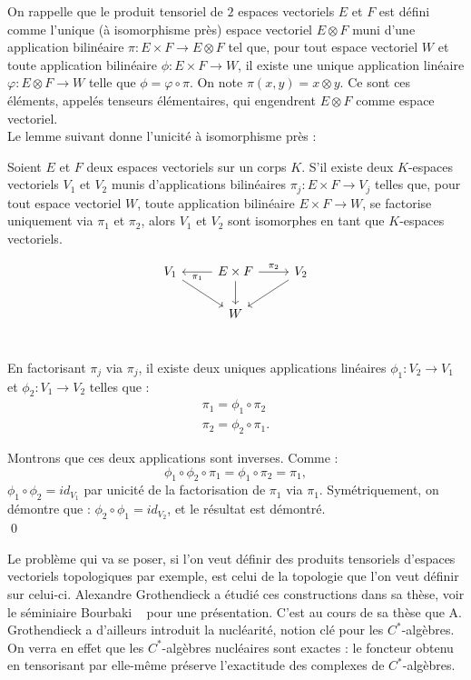 On rappelle que le produit tensoriel de $2$ espaces vectoriels $E$ et $F$ est défini comme l'unique (à isomorphisme près) espace vectoriel $E\otimes F$ muni d'une application bilinéaire $\pi : E\times F \rightarrow E\otimes F$ tel que, pour tout espace vectoriel $W$ et toute application bilinéaire $\phi : E \times F \rightarrow W $, il existe une unique application linéaire $\varphi :E\otimes F \rightarrow W$ telle que $\phi = \varphi\circ \pi$. On note $\pi(x,y)=x\otimes y$. Ce sont ces éléments, appelés tenseurs élémentaires, qui engendrent $E\otimes F$ comme espace vectoriel.\\ 

Le lemme suivant donne l'unicité à isomorphisme près :

\begin{lem}
Soient $E$ et $F$ deux espaces vectoriels sur un corps $K$. S'il existe deux $K$-espaces vectoriels $V_1$ et $V_2$ munis d'applications bilinéaires $\pi_j : E\times F \rightarrow V_j$ telles que, pour tout espace vectoriel $W$, toute application bilinéaire $E\times F \rightarrow W$,  se factorise uniquement via $\pi_1$ et $\pi_2$, alors $V_1$ et $V_2$ sont isomorphes en tant que $K$-espaces vectoriels.
\end{lem}


\[\begin{tikzcd}
V_1 \arrow{dr}& \arrow{l}{\pi_1}	E\times F \arrow{d}\arrow{r}{\pi_2}	& \arrow{dl}V_2 \\
			 & 		W		&	\\
\end{tikzcd}\]

\begin{dem}
En factorisant $\pi_j$ via $\pi_j$, il existe deux uniques applications linéaires $\phi_1 : V_2\rightarrow V_1$ et $\phi_2 : V_1\rightarrow V_2$ telles que :
\[\begin{array}{c}\pi_1=\phi_1\circ \pi_2 \\ \pi_2=\phi_2\circ \pi_1.\end{array}\]

Montrons que ces deux applications sont inverses. Comme :
\[\phi_1\circ \phi_2 \circ \pi_1 = \phi_1\circ \pi_2 =\pi_1 ,\]
$\phi_1\circ \phi_2 = id_{V_1}$ par unicité de la factorisation de $\pi_1$ via $\pi_1$.
Symétriquement, on démontre que : $\phi_2\circ \phi_1 = id_{V_2}$, et le résultat est démontré.\\
\qed
\end{dem}

Le problème qui va se poser, si l'on veut définir des produits tensoriels d'espaces vectoriels topologiques par exemple, est celui de la topologie que l'on veut définir sur celui-ci. Alexandre Grothendieck a étudié ces constructions dans sa thèse, voir le séminiaire Bourbaki ~\cite{GrothendieckNuc} pour une présentation. C'est au cours de sa thèse que A. Grothendieck a d'ailleurs introduit la nucléarité, notion clé pour les $C^*$-algèbres. On verra en effet que les $C^*$-algèbres nucléaires sont exactes : le foncteur obtenu en tensorisant par elle-même préserve l'exactitude des complexes de $C^*$-algèbres.\\


